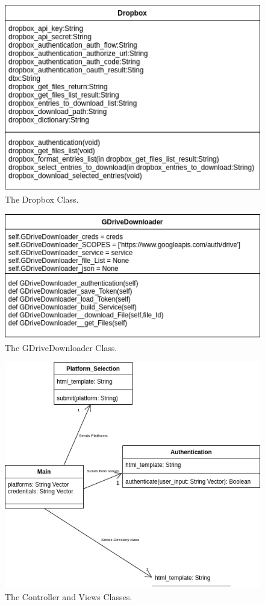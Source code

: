 \documentclass{article}
\begin{document}
\begin{figure}[p]
\includegraphics[scale=.5]{des_dropbox}
\centering
\caption{The Dropbox Class.}
\end{figure}

\begin{figure}[p]
\includegraphics[scale=.5]{des_google}
\centering
\caption{The GDriveDownloader Class.}
\end{figure}

\begin{figure}[p]
\includegraphics[scale=.5]{des_views}
\centering
\caption{The Controller and Views Classes.}
\end{figure}
\end{document}
